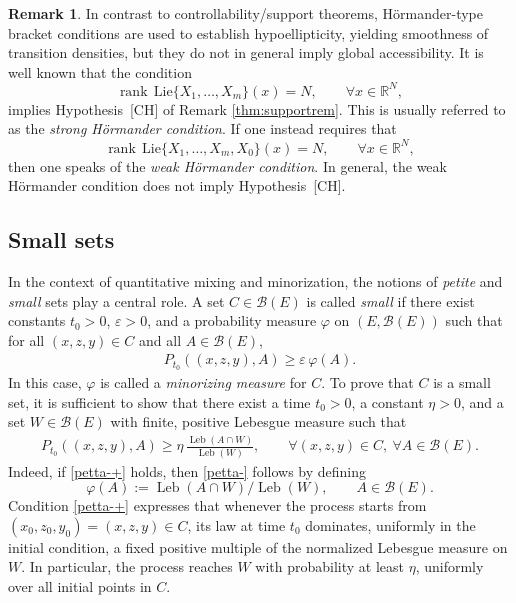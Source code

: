 \documentclass[11pt, a4paper,leqno]{amsart}
\theoremstyle{definition}
\newtheorem{remark}{Remark}[section]
\numberwithin{equation}{section}
\begin{document}
\begin{remark}\label{thm:supportrem+}
 In contrast to controllability/support theorems, Hörmander-type bracket conditions are used to establish
hypoellipticity, yielding smoothness of transition
densities, but they do not in general imply global accessibility. It is well known that the condition
\begin{equation}\label{eq:rank-spatial}
\operatorname{rank}\,\mathrm{Lie}\{X_1,\dots,X_m\}(x)
=
N,
\qquad \forall x\in \mathbb{R}^{N},
\end{equation}
implies Hypothesis~[CH] of Remark \ref{thm:supportrem}. This is usually referred to as the \emph{strong Hörmander condition}. If one instead requires that
\begin{equation}\label{eq:rank-full}
\operatorname{rank}\,\mathrm{Lie}\{X_1,\dots,X_m,X_0\}(x)
=
N,
\qquad \forall x\in \mathbb{R}^{N},
\end{equation}
then one speaks of the \emph{weak Hörmander condition}.
In general, the weak Hörmander condition does not imply Hypothesis~[CH].
\end{remark}


\subsection{Small sets}\label{small}

In the context of quantitative mixing and minorization, the notions of \emph{petite} and \emph{small} sets play a central role.
A set $C \in \mathcal B(E)$ is called \emph{small} if there exist constants
$t_0 > 0$, $\varepsilon > 0$, and a probability measure $\varphi$
on $(E,\mathcal B(E))$ such that for all $(x,z,y) \in C$ and all
$A \in \mathcal B(E)$,
\begin{align}\label{petta-}
P_{t_0}((x,z,y),A) \ge \varepsilon\,\varphi(A).
\end{align}
In this case, $\varphi$ is called a \emph{minorizing measure} for $C$. To prove that \(C\) is a small set, it is sufficient to show that there exist
a time \(t_0>0\), a constant \(\eta>0\), and a set \(W\in\mathcal B(E)\) with finite, positive Lebesgue measure such that
\begin{align}\label{petta-+}
P_{t_0}((x,z,y),A)
\ge
\eta\,\frac{\operatorname{Leb}(A\cap W)}{\operatorname{Leb}(W)},
\qquad
\forall (x,z,y)\in C,\ \forall A\in\mathcal B(E).
\end{align}
Indeed, if \eqref{petta-+} holds, then \eqref{petta-} follows by defining
\[
\varphi(A):={\operatorname{Leb}(A\cap W)}/{\operatorname{Leb}(W)},
\qquad A\in\mathcal B(E).
\]
Condition \eqref{petta-+} expresses that whenever the process starts from
\((x_0,z_0,y_0)=(x,z,y)\in C\), its law at time \(t_0\) dominates, uniformly in the initial condition, a fixed positive multiple of the normalized Lebesgue measure on \(W\).
In particular, the process reaches \(W\) with probability at least \(\eta\), uniformly over all initial points in \(C\).
\end{document}

